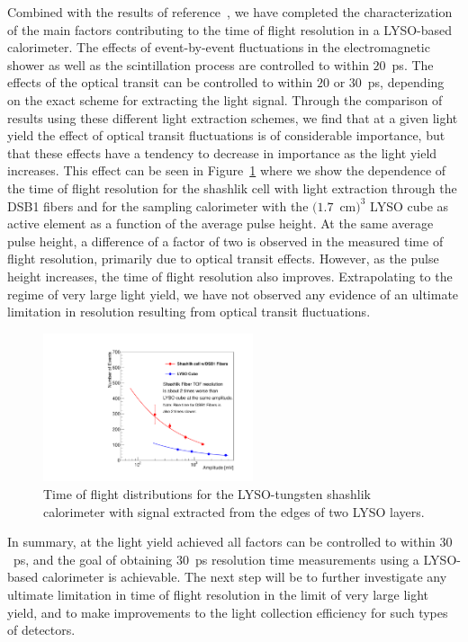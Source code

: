 \documentclass[12pt]{article}
\begin{document}
Combined with the results of reference~\cite{MCPFastCaloNIMA}, we 
have completed the characterization of the main factors
contributing to the time of flight resolution in a LYSO-based
calorimeter. The effects of event-by-event fluctuations in
the electromagnetic shower as well as the scintillation process 
are controlled to within $20$~ps. The effects of the optical transit
can be controlled to within $20$ or $30$~ps, depending on the
exact scheme for extracting the light signal. Through the comparison of results
using these different light extraction schemes, we find that at a 
given light yield the effect of optical transit fluctuations
is of considerable importance, but that these effects
have a tendency to decrease in importance as the light yield
increases. This effect can be seen in 
Figure~\ref{fig:ShashlikFiberAndCubeTOF} where we show
the dependence of the time of flight resolution
for the shashlik cell with light extraction through the
DSB1 fibers and for the sampling calorimeter with the
$(1.7$~cm$)^{3}$ LYSO cube as active element as a function
of the average pulse height. At the same average pulse height,
a difference of a factor of two is observed in the
measured time of flight resolution, primarily due to
optical transit effects. However, as the pulse height
increases, the time of flight resolution also improves.
Extrapolating to the regime of very large light yield,
we have not observed any evidence of an
ultimate limitation in resolution resulting from
optical transit fluctuations.

\begin{figure}[H] \centering
\includegraphics[width=0.55\textwidth]{figs/TimeResolutionVsEnergy_ShashlikDSB1FiberAndCube} 
\caption{ Time of flight distributions for the LYSO-tungsten shashlik calorimeter
with signal extracted from the edges of two LYSO layers. } 
\label{fig:ShashlikFiberAndCubeTOF}
\end{figure}

In summary, at the light yield achieved all factors can be controlled
to within $30$~ps, and the goal of obtaining $30$~ps
resolution time measurements using a LYSO-based calorimeter
is achievable. The next step will be to further 
investigate any ultimate limitation in time of flight
resolution in the limit of very large light yield,
and to make improvements to the light collection efficiency 
for such types of detectors.
\end{document}

